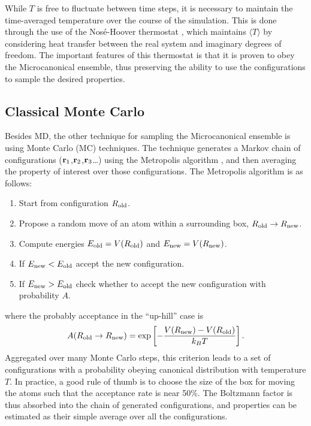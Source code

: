 While $T$ is free to fluctuate between time steps, it is necessary to maintain the
time-averaged temperature over the course of the simulation. This is done through the
use of the Nos\'e-Hoover thermostat \citep{Nose1984}, which maintains $\langle T \rangle$ by
considering heat transfer between the real system and imaginary degrees of freedom.
The important features of this thermostat is that it is proven to obey the
Microcanonical ensemble, thus preserving the ability to use the configurations to
sample the desired properties.

\subsection{Classical Monte Carlo}

Besides MD, the other technique for sampling the Microcanonical ensemble is using
Monte Carlo (MC) techniques. The technique generates a Markov chain of
configurations (${\bf r}_1$,${\bf r}_2$,${\bf r}_3$\ldots) using the Metropolis
algorithm \citep{Metropolis1953}, and then averaging the property of interest over
those configurations. The Metropolis algorithm is as follows:
%
\begin{enumerate}
    \item Start from configuration $R_{\rm old}$.
    \item Propose a random move of an atom within a surrounding box, $R_{\rm old} \to
        R_{\rm new}$.
    \item Compute energies $E_{\rm old}=V(R_{\rm old})$ and $E_{\rm new}=V(R_{\rm
        new})$.
    \item If $E_{\rm new}<E_{\rm old}$ accept the new configuration.
    \item If $E_{\rm new}>E_{\rm old}$ check whether to accept the new configuration
        with probability $A$.
\end{enumerate}
%
where the probably acceptance in the ``up-hill'' case is
%
\begin{equation}
    A(R_{\rm old}\to R_{\rm new}) = \exp\left[-\frac{V(R_{\rm new}) - V(R_{\rm old})}
    {k_B T} \right].
\end{equation}
%
Aggregated over many Monte Carlo steps, this criterion leads to a set of
configurations with a probability obeying canonical distribution with temperature $T$.
In practice, a good rule of thumb is to choose the size of the box for moving the
atoms such that the acceptance rate is near 50\%.  The Boltzmann factor is thus
absorbed into the chain of generated configurations, and properties can be estimated
as their simple average over all the configurations.

